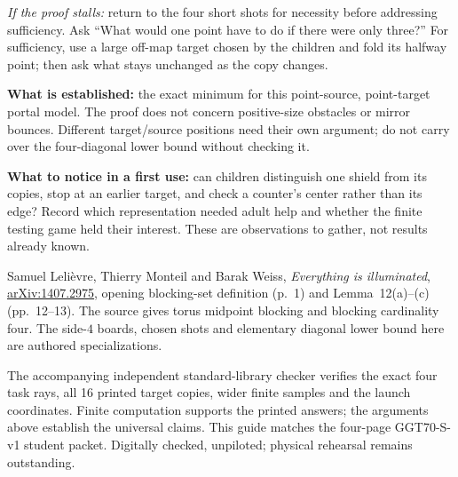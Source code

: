 \documentclass[11pt,letterpaper]{article}
\newcommand{\sectiontitle}[1]{\par\vspace{4pt}{\large\bfseries #1}\par}
\begin{document}
\textit{If the proof stalls:} return to the four short shots for necessity before addressing sufficiency. Ask ``What would one point have to do if there were only three?'' For sufficiency, use a large off-map target chosen by the children and fold its halfway point; then ask what stays unchanged as the copy changes.

\sectiontitle{Use the conclusion carefully}
\textbf{What is established:} the exact minimum for this point-source, point-target portal model. The proof does not concern positive-size obstacles or mirror bounces. Different target/source positions need their own argument; do not carry over the four-diagonal lower bound without checking it.

\textbf{What to notice in a first use:} can children distinguish one shield from its copies, stop at an earlier target, and check a counter's center rather than its edge? Record which representation needed adult help and whether the finite testing game held their interest. These are observations to gather, not results already known.

\sectiontitle{Source and verification}
Samuel Leli\`evre, Thierry Monteil and Barak Weiss, \emph{Everything is illuminated}, \href{https://arxiv.org/pdf/1407.2975}{arXiv:1407.2975}, opening blocking-set definition (p.~1) and Lemma~12(a)--(c) (pp.~12--13). The source gives torus midpoint blocking and blocking cardinality four. The side-$4$ boards, chosen shots and elementary diagonal lower bound here are authored specializations.

The accompanying independent standard-library checker verifies the exact four task rays, all 16 printed target copies, wider finite samples and the launch coordinates. Finite computation supports the printed answers; the arguments above establish the universal claims. This guide matches the four-page GGT70-S-v1 student packet. Digitally checked, unpiloted; physical rehearsal remains outstanding.
\end{document}
